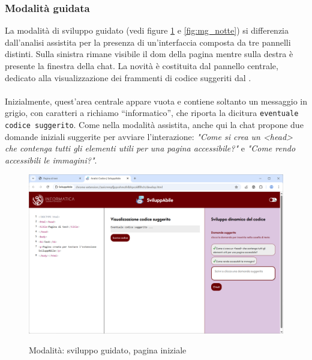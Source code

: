\subsubsection{Modalità guidata}
\noindent La modalità di sviluppo guidato (vedi figure \ref{fig:mg} e \ref{fig:mg_notte}) si differenzia dall’analisi assistita per la presenza di un’interfaccia composta da tre pannelli distinti. Sulla sinistra rimane visibile il \acrshort{dom} della pagina mentre sulla destra è presente la finestra della chat. La novità è costituita dal pannello centrale, dedicato alla visualizzazione dei frammenti di codice suggeriti dal .\\
\\
Inizialmente, quest’area centrale appare vuota e contiene soltanto un messaggio in grigio, con caratteri a richiamo “informatico”, che riporta la dicitura \texttt{eventuale codice suggerito}. Come nella modalità assistita, anche qui la chat propone due domande iniziali suggerite per avviare l’interazione: \textit{"Come si crea un <head> che contenga tutti gli elementi utili per una pagina accessibile?"} e \textit{"Come rendo accessibili le immagini?"}.\\

\begin{figure}[H]
    \centering
    \includegraphics[width=1\linewidth, alt={Modalità di sviluppo guidato}]{img/mg.png}
    \caption{Modalità: sviluppo guidato, pagina iniziale}\label{fig:mg}
\end{figure}

